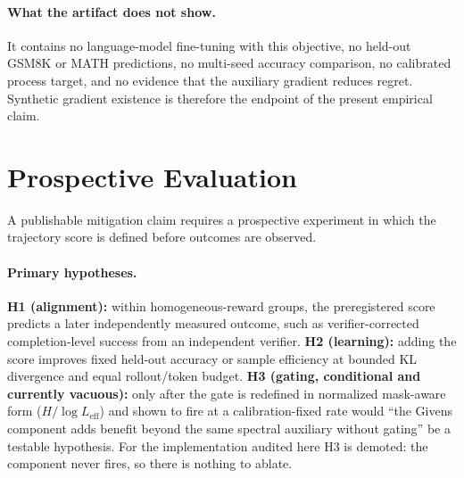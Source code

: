 \documentclass{article}
\begin{document}
\paragraph{What the artifact does not show.}
It contains no language-model fine-tuning with this objective, no held-out
GSM8K \citep{cobbe2021gsm8k} or MATH \citep{hendrycks2021math} predictions, no multi-seed accuracy comparison, no calibrated
process target, and no evidence that the auxiliary gradient reduces regret.
Synthetic gradient existence is therefore the endpoint of the present
empirical claim.

\section{Prospective Evaluation}
\label{sec:prospective}

A publishable mitigation claim requires a prospective experiment in which the
trajectory score is defined before outcomes are observed.

\paragraph{Primary hypotheses.}
\textbf{H1 (alignment):} within homogeneous-reward groups, the preregistered
score predicts a later independently measured outcome, such as
verifier-corrected completion-level success from an independent verifier.
\textbf{H2 (learning):} adding the score improves fixed held-out accuracy or
sample efficiency at bounded KL divergence and equal rollout/token budget.
\textbf{H3 (gating, conditional and currently vacuous):} only after the
gate is redefined in normalized mask-aware form ($H/\log
L_{\mathrm{eff}}$) and shown to fire at a calibration-fixed rate would
``the Givens component adds benefit beyond the same spectral auxiliary
without gating'' be a testable hypothesis. For the implementation
audited here H3 is demoted: the component never fires, so there is
nothing to ablate.
\end{document}
